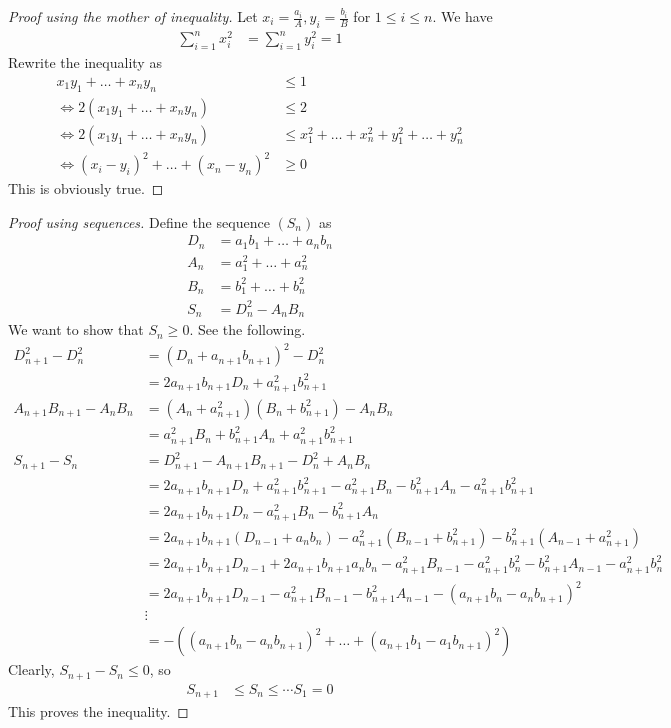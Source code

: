 \documentclass{subfile}
\begin{document}
		\begin{proof}[Proof using the mother of inequality]
			Let $x_i=\frac{a_i}{A},y_i=\frac{b_i}{B}$ for $1\leq i\leq n$. We have
				\begin{align*}
					\sum_{i=1}^nx_i^2
						& = \sum_{i=1}^ny_i^2=1
				\end{align*}
			Rewrite the inequality as
				\begin{align*}
					x_1y_1+\ldots+x_ny_n
						& \leq1\\
					\iff2(x_1y_1+\ldots+x_ny_n)
						& \leq2\\
					\iff2(x_1y_1+\ldots+x_ny_n)
						& \leq x_1^2+\ldots+x_n^2+y_1^2+\ldots+y_n^2\\
					\iff(x_i-y_i)^2+\ldots+(x_n-y_n)^2
						& \geq0
				\end{align*}
			This is obviously true.
		\end{proof}
	
		\begin{proof}[Proof using sequences]
			Define the sequence $(S_n)$ as
				\begin{align*}
					D_n
						& = a_1b_1+\ldots+a_nb_n\\
					A_n
						& = a_1^2+\ldots+a_n^2\\
					B_n
						& = b_1^2+\ldots+b_n^2\\
					S_n
						& = D_n^2-A_nB_n
				\end{align*}
			We want to show that $S_n\geq0$. See the following.
				\begin{align*}
					D_{n+1}^2-D_n^2
						& = (D_n+a_{n+1}b_{n+1})^2-D_n^2\\
						& = 2a_{n+1}b_{n+1}D_n+a_{n+1}^2b_{n+1}^2\\
					A_{n+1}B_{n+1}-A_nB_n
						& = (A_n+a_{n+1}^2)(B_n+b_{n+1}^2)-A_nB_n\\
						& = a_{n+1}^2B_n+b_{n+1}^2A_n+a_{n+1}^2b_{n+1}^2\\
					S_{n+1}-S_n
						& = D_{n+1}^2-A_{n+1}B_{n+1}-D_n^2+A_nB_n\\
						& = 2a_{n+1}b_{n+1}D_n+a_{n+1}^2b_{n+1}^2-a_{n+1}^2B_n-b_{n+1}^2A_n-a_{n+1}^2b_{n+1}^2\\
						& = 2a_{n+1}b_{n+1}D_n-a_{n+1}^2B_n-b_{n+1}^2A_n\\
						& = 2a_{n+1}b_{n+1}(D_{n-1}+a_nb_n)-a_{n+1}^2(B_{n-1}+b_{n+1}^2)-b_{n+1}^2(A_{n-1}+a_{n+1}^2)\\
						& = 2a_{n+1}b_{n+1}D_{n-1}+2a_{n+1}b_{n+1}a_nb_n-a_{n+1}^2B_{n-1}-a_{n+1}^2b_{n}^2-b_{n+1}^2A_{n-1}-a_{n+1}^2b_{n}^2\\
						& = 2a_{n+1}b_{n+1}D_{n-1}-a_{n+1}^2B_{n-1}-b_{n+1}^2A_{n-1}-(a_{n+1}b_n-a_{n}b_{n+1})^2\\
						& \vdots\\
						& = -\left((a_{n+1}b_n-a_nb_{n+1})^2+\ldots+(a_{n+1}b_1-a_1b_{n+1})^2\right)
				\end{align*}
			Clearly, $S_{n+1}-S_n\leq0$, so
				\begin{align*}
					S_{n+1}
						& \leq S_n\leq\cdots S_1=0
				\end{align*}
			This proves the inequality.
		\end{proof}
\end{document}
